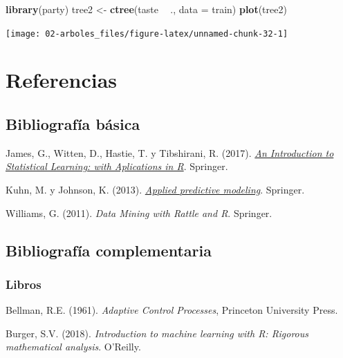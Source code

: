 \documentclass[]{book}
\newenvironment{Shaded}{\begin{snugshade}}{\end{snugshade}}
\newcommand{\KeywordTok}[1]{\textcolor[rgb]{0.13,0.29,0.53}{\textbf{#1}}}
\newcommand{\DataTypeTok}[1]{\textcolor[rgb]{0.13,0.29,0.53}{#1}}
\newcommand{\StringTok}[1]{\textcolor[rgb]{0.31,0.60,0.02}{#1}}
\newcommand{\OperatorTok}[1]{\textcolor[rgb]{0.81,0.36,0.00}{\textbf{#1}}}
\newcommand{\NormalTok}[1]{#1}
\theoremstyle{break}
\theoremstyle{definition}
\theoremstyle{definition}
\theoremstyle{definition}
\theoremstyle{remark}
\begin{document}
\begin{Shaded}
\begin{Highlighting}[]
\KeywordTok{library}\NormalTok{(party)}
\NormalTok{tree2 <-}\StringTok{ }\KeywordTok{ctree}\NormalTok{(taste }\OperatorTok{~}\StringTok{ }\NormalTok{., }\DataTypeTok{data =}\NormalTok{ train) }
\KeywordTok{plot}\NormalTok{(tree2)}
\end{Highlighting}
\end{Shaded}

\begin{center}\texttt{[image: 02-arboles\_files/figure-latex/unnamed-chunk-32-1]} \end{center}

\chapter*{Referencias}\label{referencias}

\section*{Bibliografía básica}\label{bibliografuxeda-buxe1sica}

James, G., Witten, D., Hastie, T. y Tibshirani, R. (2017).
\emph{\href{http://faculty.marshall.usc.edu/gareth-james/ISL}{An
Introduction to Statistical Learning: with Aplications in R}}. Springer.

Kuhn, M. y Johnson, K. (2013).
\emph{\href{http://appliedpredictivemodeling.com}{Applied predictive
modeling}}. Springer.

Williams, G. (2011). \emph{Data Mining with Rattle and R}. Springer.

\section*{Bibliografía
complementaria}\label{bibliografuxeda-complementaria}

\subsection*{Libros}\label{libros}

Bellman, R.E. (1961). \emph{Adaptive Control Processes}, Princeton
University Press.

Burger, S.V. (2018). \emph{Introduction to machine learning with R:
Rigorous mathematical analysis}. O'Reilly.
\end{document}
